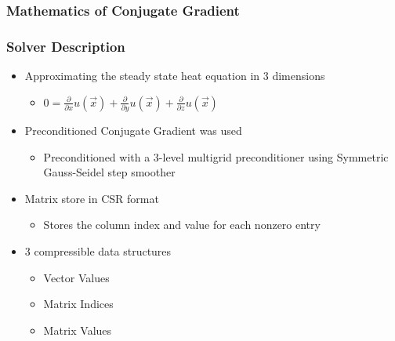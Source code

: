 \documentclass{beamer}
\begin{document}
\begin{frame}
	\frametitle{Mathematics of Conjugate Gradient}
	\centering
\end{frame}

\begin{frame}
	\frametitle{Solver Description}
	\begin{itemize}
		\item Approximating the steady state heat equation in 3 dimensions
		\begin{itemize}
			\item \(0 = \frac{\partial}{\partial x}u(\vec{x}) +\frac{\partial}{\partial y}u(\vec{x}) + \frac{\partial}{\partial z}u(\vec{x})\)
		\end{itemize}
		\item Preconditioned Conjugate Gradient was used
		\begin{itemize}
			\item Preconditioned with a 3-level multigrid preconditioner using Symmetric Gauss-Seidel step smoother
		\end{itemize}
		\item Matrix store in CSR format
		\begin{itemize}
			\item Stores the column index and value for each nonzero entry
		\end{itemize}
		\item 3 compressible data structures
		\begin{itemize}
			\item Vector Values
			\item Matrix Indices
			\item Matrix Values
		\end{itemize}
	\end{itemize}
\end{frame}
\end{document}
